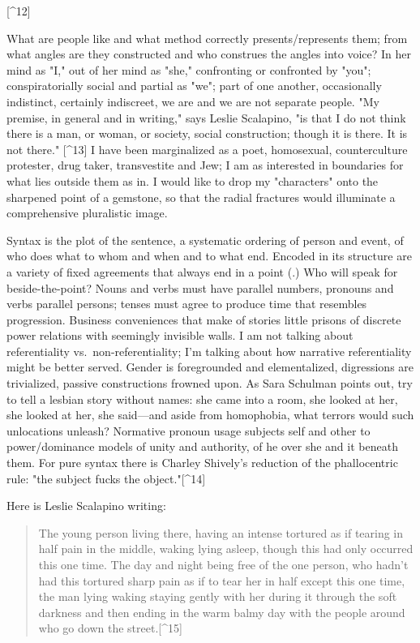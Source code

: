 \documentclass[
]{memoir}
\newlength{\drop}%
\begin{document}
{[}\^{}12{]}

What are people like and what method correctly presents/represents them;
from what angles are they constructed and who construes the angles into
voice? In her mind as "I," out of her mind as "she," confronting or
confronted by "you"; conspiratorially social and partial as "we"; part
of one another, occasionally indistinct, certainly indiscreet, we are
and we are not separate people. "My premise, in general and in writing,"
says Leslie Scalapino, "is that I do not think there is a man, or woman,
or society, social construction; though it is there. It is not there."
{[}\^{}13{]} I have been marginalized as a poet, homosexual,
counterculture protester, drug taker, transvestite and Jew; I am as
interested in boundaries for what lies outside them as in. I would like
to drop my "characters" onto the sharpened point of a gemstone, so that
the radial fractures would illuminate a comprehensive pluralistic image.

Syntax is the plot of the sentence, a systematic ordering of person and
event, of who does what to whom and when and to what end. Encoded in its
structure are a variety of fixed agreements that always end in a point
(.) Who will speak for beside-the-point? Nouns and verbs must have
parallel numbers, pronouns and verbs parallel persons; tenses must agree
to produce time that resembles progression. Business conveniences that
make of stories little prisons of discrete power relations with
seemingly invisible walls. I am not talking about referentiality
vs.~non-referentiality; I'm talking about how narrative referentiality
might be better served. Gender is foregrounded and elementalized,
digressions are trivialized, passive constructions frowned upon. As Sara
Schulman points out, try to tell a lesbian story without names: she came
into a room, she looked at her, she looked at her, she said---and aside
from homophobia, what terrors would such unlocations unleash? Normative
pronoun usage subjects self and other to power/dominance models of unity
and authority, of he over she and it beneath them. For pure syntax there
is Charley Shively's reduction of the phallocentric rule: "the subject
fucks the object."{[}\^{}14{]}

Here is Leslie Scalapino writing:

\begin{quote}
The young person living there, having an intense tortured as if tearing
in half pain in the middle, waking lying asleep, though this had only
occurred this one time. The day and night being free of the one person,
who hadn't had this tortured sharp pain as if to tear her in half except
this one time, the man lying waking staying gently with her during it
through the soft darkness and then ending in the warm balmy day with the
people around who go down the street.{[}\^{}15{]}
\end{quote}
\end{document}
